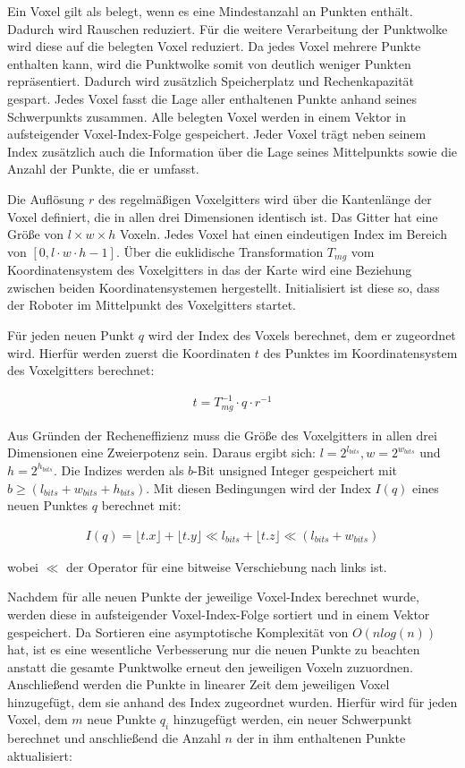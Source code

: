 Ein Voxel gilt als belegt, wenn es eine Mindestanzahl an Punkten enthält. Dadurch wird Rauschen reduziert.  Für die weitere Verarbeitung der Punktwolke wird diese auf die belegten Voxel reduziert. Da jedes Voxel mehrere Punkte enthalten kann, wird die Punktwolke somit von deutlich weniger Punkten repräsentiert. Dadurch wird zusätzlich Speicherplatz und Rechenkapazität gespart. Jedes Voxel fasst die Lage aller enthaltenen Punkte anhand seines Schwerpunkts zusammen. Alle belegten Voxel werden in einem Vektor in aufsteigender Voxel-Index-Folge gespeichert. Jeder Voxel trägt neben seinem Index zusätzlich auch die Information über die Lage seines Mittelpunkts sowie die Anzahl der Punkte, die er umfasst. 

Die Auflösung $ r $ des regelmäßigen Voxelgitters wird über die Kantenlänge der Voxel definiert, die in allen drei Dimensionen identisch ist. Das Gitter hat eine Größe von $ l \times w \times h $ Voxeln. Jedes Voxel hat einen eindeutigen Index im Bereich von $ [0,l \cdot w \cdot h -1] $. Über die euklidische Transformation $ T_{mg} $ vom Koordinatensystem des Voxelgitters in das der Karte wird eine Beziehung zwischen beiden Koordinatensystemen hergestellt. Initialisiert ist diese so, dass der Roboter im Mittelpunkt des Voxelgitters startet.  

Für jeden neuen Punkt $ q $ wird der Index des Voxels berechnet, dem er zugeordnet wird.  Hierfür werden zuerst die Koordinaten $ t $ des Punktes im Koordinatensystem des Voxelgitters berechnet: 

\begin{align}
	t = T_{mg}^{-1} \cdot q \cdot r^{-1}
\end{align}

Aus Gründen der Recheneffizienz muss die Größe des Voxelgitters in allen drei Dimensionen eine Zweierpotenz sein. Daraus ergibt sich: $ l = 2^{l_{bits}}, w = 2^{w_{bits}} $ und $ h = 2^{h_{bits}} $. Die Indizes werden als $ b $-Bit unsigned Integer gespeichert mit $ b \geq (l_{bits} + w_{bits} + h_{bits}) $. Mit diesen Bedingungen wird der Index $ I(q) $ eines neuen Punktes $ q $ berechnet mit: 

\begin{align}
	I(q) = \lfloor t.x \rfloor + \lfloor t.y \rfloor \ll l_{bits} + \lfloor t.z \rfloor \ll (l_{bits} + w_{bits})
\end{align}

wobei $ \ll $ der Operator für eine bitweise Verschiebung nach links ist. 

Nachdem für alle neuen Punkte der jeweilige Voxel-Index berechnet wurde, werden diese in aufsteigender Voxel-Index-Folge sortiert und in einem Vektor gespeichert. Da Sortieren eine asymptotische Komplexität von $ O(n log (n)) $ hat, ist es eine wesentliche Verbesserung nur die neuen Punkte zu beachten anstatt die gesamte Punktwolke erneut den jeweiligen Voxeln zuzuordnen.  Anschließend werden die Punkte in linearer Zeit dem jeweiligen Voxel hinzugefügt, dem sie anhand des Index zugeordnet wurden. Hierfür wird für jeden Voxel, dem $ m $ neue Punkte $ q_i $ hinzugefügt werden, ein neuer Schwerpunkt berechnet und anschließend die Anzahl $ n $ der in ihm enthaltenen Punkte aktualisiert:  

